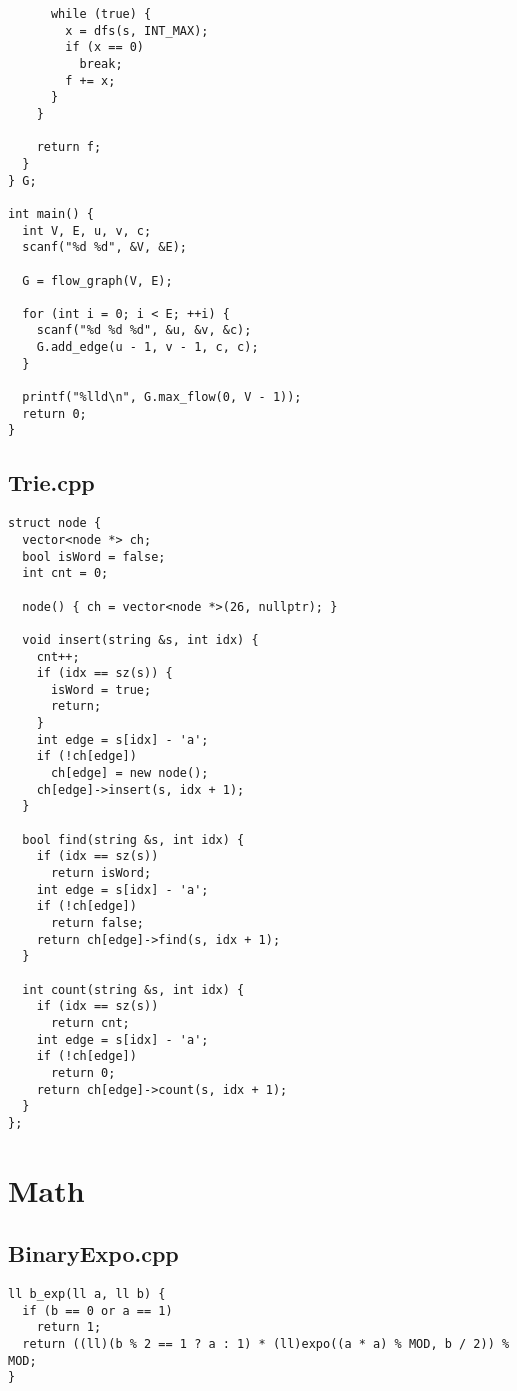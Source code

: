 \documentclass[10pt]{article}
\begin{document}
\begin{multicols*}{3}
\begin{lstlisting}
      while (true) {
        x = dfs(s, INT_MAX);
        if (x == 0)
          break;
        f += x;
      }
    }

    return f;
  }
} G;

int main() {
  int V, E, u, v, c;
  scanf("%d %d", &V, &E);

  G = flow_graph(V, E);

  for (int i = 0; i < E; ++i) {
    scanf("%d %d %d", &u, &v, &c);
    G.add_edge(u - 1, v - 1, c, c);
  }

  printf("%lld\n", G.max_flow(0, V - 1));
  return 0;
}

\end{lstlisting}
\subsection*{Trie.cpp}
\nopagebreak[4]
\begin{lstlisting}
struct node {
  vector<node *> ch;
  bool isWord = false;
  int cnt = 0;

  node() { ch = vector<node *>(26, nullptr); }

  void insert(string &s, int idx) {
    cnt++;
    if (idx == sz(s)) {
      isWord = true;
      return;
    }
    int edge = s[idx] - 'a';
    if (!ch[edge])
      ch[edge] = new node();
    ch[edge]->insert(s, idx + 1);
  }

  bool find(string &s, int idx) {
    if (idx == sz(s))
      return isWord;
    int edge = s[idx] - 'a';
    if (!ch[edge])
      return false;
    return ch[edge]->find(s, idx + 1);
  }

  int count(string &s, int idx) {
    if (idx == sz(s))
      return cnt;
    int edge = s[idx] - 'a';
    if (!ch[edge])
      return 0;
    return ch[edge]->count(s, idx + 1);
  }
};

\end{lstlisting}
\section*{Math}
\nopagebreak[4]
\subsection*{BinaryExpo.cpp}
\nopagebreak[4]
\begin{lstlisting}
ll b_exp(ll a, ll b) {
  if (b == 0 or a == 1)
    return 1;
  return ((ll)(b % 2 == 1 ? a : 1) * (ll)expo((a * a) % MOD, b / 2)) % MOD;
}


\end{lstlisting}
\end{multicols*}
\end{document}
